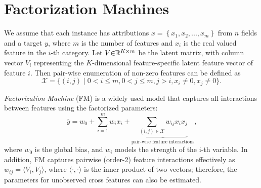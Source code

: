 \documentclass[letterpaper]{article} \usepackage{aaai19}  \usepackage{times}  \usepackage{helvet}  \usepackage{courier}  \usepackage{url}  \usepackage{graphicx}  \frenchspacing  \setlength{\pdfpagewidth}{8.5in}  \setlength{\pdfpageheight}{11in}  \usepackage{mathtools}
\begin{document}
\section{Factorization Machines}\label{sec:fm}

We assume that each instance has attributions $x=\left\{x_{1},x_{2},...,x_{m}\right\} $ from $n$ fields and a target $y$, where $m$ is the number of features and $x_i$ is the real valued feature in the $i$-th category.
Let $V\text{\ensuremath{\in}}\mathbb{R}^{K\times m}$
be the latent matrix, with column vector
$V_{i}$ representing the $K$-dimensional feature-specific latent feature vector of feature $i$. Then pair-wise  enumeration of non-zero features can be defined as
\begin{equation}
\mathcal{X}=\{(i,j)\mid0<i\le m,0<j\le m,j>i,x_i\neq0,x_j\neq0\}.
\end{equation}

\emph{Factorization Machine} (FM)\cite{rendle2010factorization} is a widely used model that captures all interactions between features using the factorized parameters:
\begin{equation}
\overline{y}=w_0 + \sum_{i=1}^m{w_{i}x_{i}}+\underbrace{\sum_{(i,j)\in \mathcal{X}}w_{ij}x_{i}x_{j}}_\text{pair-wise feature interactions} \text{,}\label{eq:fm}
\end{equation}
where $w_0$ is the global bias, and $w_i$ models the strength of the i-th variable. In addition, FM captures pairwise (order-2) feature interactions effectively as $w_{ij}=\langle V_i,V_j\rangle$, where $\langle\cdot{,}\cdot\rangle$ is the inner product of two vectors; therefore, the parameters for unobserved cross features can also be estimated. 
\end{document}
